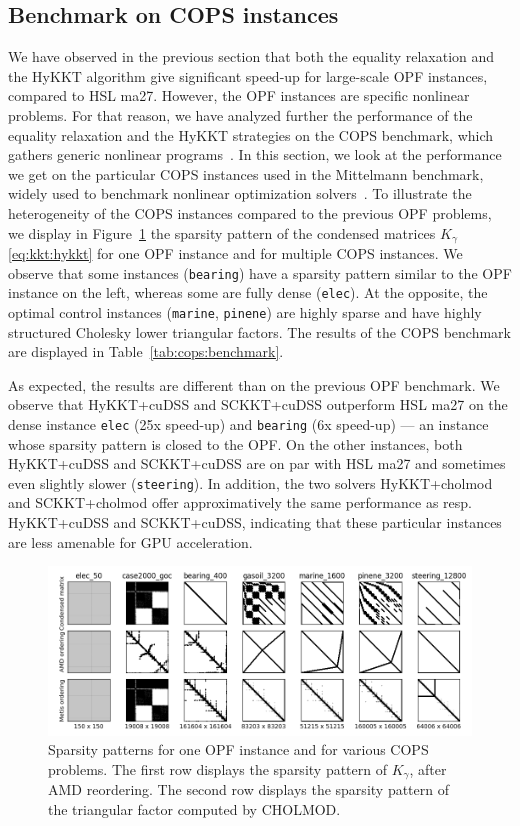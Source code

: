 \subsection{Benchmark on COPS instances}
We have observed in the previous section that both the equality relaxation
and the HyKKT algorithm give significant speed-up for large-scale
OPF instances, compared to HSL ma27.
However, the OPF instances are specific nonlinear problems.
For that reason, we have analyzed further the performance of
the equality relaxation and the HyKKT strategies on the COPS benchmark,
which gathers generic nonlinear programs~\cite{dolan2004benchmarking}.
In this section, we look at the performance we get on the particular COPS instances used in
the Mittelmann benchmark, widely used to benchmark nonlinear optimization
solvers~\cite{mittelmann2002benchmark}.
To illustrate the heterogeneity of the COPS instances compared to the
previous OPF problems, we display in Figure~\ref{fig:cops:nnz} the sparsity pattern of the
condensed matrices $K_\gamma$ \eqref{eq:kkt:hykkt} for one OPF instance and for multiple
COPS instances. We observe that some instances ({\tt bearing}) have a sparsity pattern
similar to the OPF instance on the left, whereas some are fully dense ({\tt elec}).
At the opposite, the optimal control instances ({\tt marine}, {\tt pinene}) are
highly sparse and have highly structured Cholesky lower triangular factors.
The results of the COPS benchmark are displayed in Table~\ref{tab:cops:benchmark}.

As expected, the results are different than on the previous OPF benchmark.
We observe that HyKKT+cuDSS and SCKKT+cuDSS outperform HSL ma27 on the dense instance {\tt elec}
(25x speed-up) and {\tt bearing} (6x speed-up) --- an instance whose sparsity pattern
is closed to the OPF. On the other instances, both HyKKT+cuDSS and SCKKT+cuDSS are
on par with HSL ma27 and sometimes even slightly slower ({\tt steering}).
In addition, the two solvers HyKKT+cholmod and SCKKT+cholmod offer approximatively
the same performance as resp. HyKKT+cuDSS and SCKKT+cuDSS, indicating that these
particular instances are less amenable for GPU acceleration.

\begin{figure}[!ht]
  \centering
  \includegraphics[width=.9\textwidth]{../figures/sparsity_pattern.png}
  \caption{Sparsity patterns for one OPF instance and for various
    COPS problems. The first row displays the sparsity pattern
    of $K_\gamma$, after AMD reordering. The second row displays
    the sparsity pattern of the triangular factor computed by CHOLMOD.
    \label{fig:cops:nnz}
  }
\end{figure}



